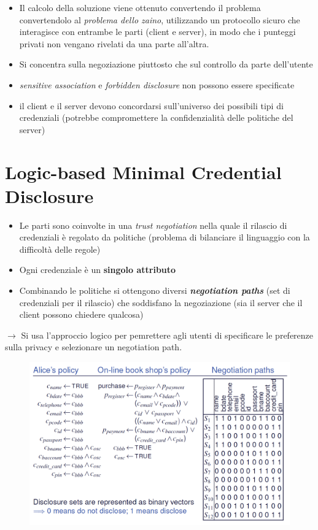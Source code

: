 \documentclass{report}
\begin{document}
\begin{itemize}
    \item Il calcolo della soluzione viene ottenuto convertendo il problema convertendolo 
    al \textit{problema dello zaino}, utilizzando un protocollo sicuro che interagisce con entrambe le parti (client e server), in modo 
    che i punteggi privati non vengano rivelati da una parte all'altra.
    \item Si concentra sulla negoziazione piuttosto che sul controllo da parte dell'utente 
    \item \textit{sensitive association} e \textit{forbidden disclosure} non possono essere specificate
    \item il client e il server devono concordarsi sull'universo dei possibili tipi di credenziali (potrebbe compromettere la confidenzialità delle politiche del server)
\end{itemize}


\chapter{Logic-based Minimal Credential Disclosure}
\begin{itemize}
    \item Le parti sono coinvolte in una \textit{trust negotiation} nella quale il rilascio di
    credenziali è regolato da politiche (problema di bilanciare il linguaggio con la difficoltà delle regole)
    \item Ogni credenziale è un \textbf{singolo attributo}
    \item Combinando le politiche si ottengono diversi \textbf{\textit{negotiation paths}} (set di credenziali per il rilascio) che soddisfano la negoziazione (sia il server che il client possono chiedere qualcosa)
\end{itemize}

$ \rightarrow $ Si usa l'approccio logico per pemrettere agli utenti di specificare le preferenze sulla privacy e selezionare un negotiation path.

\begin{figure}[ht]
    \centering
    \includegraphics[width=0.85\linewidth]{images/logical-based minimal cred.png}
\end{figure}
\end{document}
